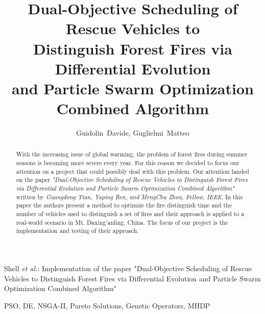 \documentclass[journal]{IEEEtran}
\begin{document}
\title{Dual-Objective Scheduling of Rescue Vehicles to\\
Distinguish Forest Fires via Differential Evolution\\
and Particle Swarm Optimization\\
Combined Algorithm}

\author{Guidolin~Davide,
        Guglielmi~Matteo}%

%
{Shell \MakeLowercase{\textit{et al.}}: Implementation of the paper "Dual-Objective Scheduling of Rescue Vehicles to 
Distinguish Forest Fires via Differential Evolution
and Particle Swarm Optimization
Combined Algorithm"}
\maketitle

\begin{abstract}
With the increasing issue of global warming, the problem of forest fires during summer seasons is becoming more severe every year.
For this reason we decided to focus our attention on a project that could possibly deal with this problem. Our attention landed on the paper 
\textit{"Dual-Objective Scheduling of Rescue Vehicles to Distinguish Forest Fires via Differential Evolution and Particle Swarm Optimization Combined Algorithm"}
written by \textit{Guangdong Tian, Yaping Ren, and MengChu Zhou, Fellow, IEEE}. 
In this paper the authors present a method to optimize the fire distinguish time and the number of vehicles used to distinguish a set of fires and their approach is applied to a real-world scenario in Mt. Daxing’anling, China.
The focus of our project is the implementation and testing of their approach.
\end{abstract}

\begin{IEEEkeywords}
    PSO, DE, NSGA-II, Pareto Solutions, Genetic Operators, MHDP
\end{IEEEkeywords}

\IEEEpeerreviewmaketitle








\end{document}
